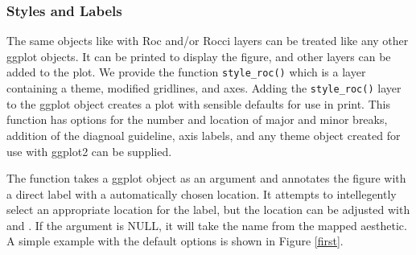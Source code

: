\documentclass[codesnippet]{jss}
\begin{document}
\subsubsection{Styles and Labels}\label{styles-and-labels}

The same objects like  with Roc and/or Rocci layers can
be treated like any other ggplot objects. It can be printed to display
the figure, and other layers can be added to the plot. We provide the
function \texttt{style\_roc()} which is a layer containing a theme,
modified gridlines, and axes. Adding the \texttt{style\_roc()} layer to
the ggplot object creates a plot with sensible defaults for use in
print. This function has options for the number and location of major
and minor breaks, addition of the diagnoal guideline, axis labels, and
any theme object created for use with ggplot2 can be supplied.

The  function takes a ggplot object as an argument
and annotates the figure with a direct label with a automatically chosen
location. It attempts to intellegently select an appropriate location
for the label, but the location can be adjusted with
 and . If the 
argument is NULL, it will take the name from the mapped aesthetic. A
simple example with the default options is shown in Figure \ref{first}.
\end{document}
